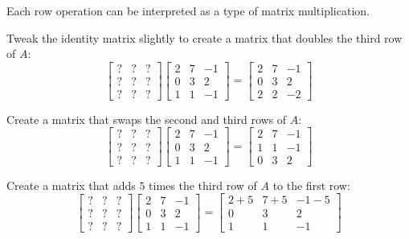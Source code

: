 \begin{applicationActivities}{2}{22}
\begin{activity}{15}
Each row operation can be interpreted as a type of matrix multiplication.
\begin{subactivity}
Tweak the identity matrix slightly to create a matrix that
doubles the third row of $A$:
\[
 \begin{bmatrix} ? & ? & ? \\ ? & ? & ? \\ ? & ? & ? \end{bmatrix}
 \begin{bmatrix} 2 & 7 & -1 \\ 0 & 3 & 2 \\ 1 & 1 & -1 \end{bmatrix}
=
 \begin{bmatrix} 2 & 7 & -1 \\ 0 & 3 & 2 \\ 2 & 2 & -2 \end{bmatrix}
\]
\end{subactivity}
\begin{subactivity}
  Create a matrix that swaps the second and third rows of $A$:
  \[
   \begin{bmatrix} ? & ? & ? \\ ? & ? & ? \\ ? & ? & ? \end{bmatrix}
   \begin{bmatrix} 2 & 7 & -1 \\ 0 & 3 & 2 \\ 1 & 1 & -1 \end{bmatrix}
  =
  \begin{bmatrix} 2 & 7 & -1 \\ 1 & 1 & -1 \\ 0 & 3 & 2 \end{bmatrix}
  \]
\end{subactivity}
\begin{subactivity}
Create a matrix that adds $5$ times the third row of $A$ to the first row:
\[
 \begin{bmatrix} ? & ? & ? \\ ? & ? & ? \\ ? & ? & ? \end{bmatrix}
 \begin{bmatrix} 2 & 7 & -1 \\ 0 & 3 & 2 \\ 1 & 1 & -1 \end{bmatrix}
=
 \begin{bmatrix} 2+5 & 7+5 & -1-5 \\ 0 & 3 & 2 \\ 1 & 1 & -1 \end{bmatrix}
\]
\end{subactivity}
\end{activity}


\end{applicationActivities}
